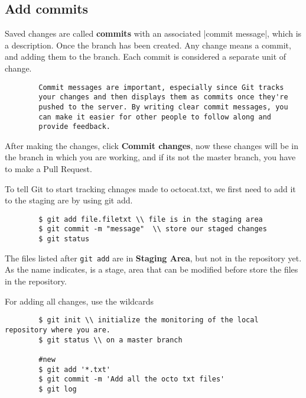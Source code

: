 \documentclass[12pt]{article}
\begin{document}
	

	\subsection{Add commits}

		Saved changes are called \textbf{commits} with an associated  \erb|commit message|, which is a description. Once the branch has been created. Any change means a commit, and adding them to the branch. Each commit is considered a separate unit of change. 

		\begin{centering}
		\begin{verbatim}
		Commit messages are important, especially since Git tracks 
		your changes and then displays them as commits once they're
		pushed to the server. By writing clear commit messages, you 
		can make it easier for other people to follow along and 
		provide feedback.
		\end{verbatim}
		\end{centering}
	
		After making the changes, click \textbf{Commit changes}, now these changes will be in the branch in which you are working, and if its not the master branch, you have to make a Pull Request. 

		To tell Git to start tracking chnages made to octocat.txt, we first need to add it to the staging are by using git add. 
		
		\begin{verbatim}
		$ git add file.filetxt \\ file is in the staging area
		$ git commit -m "message"  \\ store our staged changes
		$ git status
		\end{verbatim}

		The files listed after \verb|git add| are in \textbf{Staging Area}, but not in the repository yet. As the name indicates, is a stage, area that can be modified before store the files in the repository. 

		For adding all changes, use the wildcards

		\begin{verbatim}
		$ git init \\ initialize the monitoring of the local repository where you are.
		$ git status \\ on a master branch

		#new 
		$ git add '*.txt'
		$ git commit -m 'Add all the octo txt files'
		$ git log
		\end{verbatim}
\end{document}
